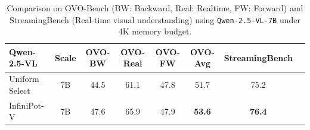 \begin{table}[t]
\small
\centering
\begin{tabular}{l c c c c c c c}
\toprule
\textbf{Qwen-2.5-VL} & \textbf{Scale}
& \textbf{OVO-BW} & \textbf{OVO-Real} & \textbf{OVO-FW} 
& \textbf{OVO-Avg} & \textbf{StreamingBench} \\
\midrule
Uniform Select & 7B & 44.5 & 61.1 & 47.8 & 51.7 & 75.2 \\
InfiniPot-V & 7B & 47.6 & 65.9 & 47.9 & \textbf{53.6} & \textbf{76.4} \\
\bottomrule
\end{tabular}
\vspace{.1in}
\caption{Comparison on OVO-Bench (BW: Backward, Real: Realtime, FW: Forward) and StreamingBench (Real-time visual understanding) using \texttt{Qwen-2.5-VL-7B} under 4K memory budget.}
\label{tab:ovo_results}
\vspace{-.2in}
\end{table}
